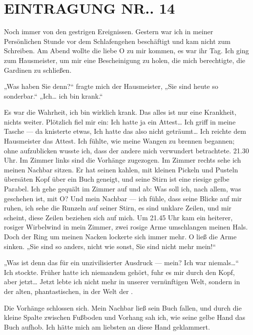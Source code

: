 \section{EINTRAGUNG NR.. 14}

Noch immer von den gestrigen Ereignissen. Gestern war ich in meiner
Persönlichen Stunde vor dem Schlafengehen beschäftigt und kam nicht
zum Schreiben. Am Abend wollte die liebe O zu mir kommen, es war
ihr Tag. Ich ging zum Hausmeister, um mir eine Bescheinigung zu
holen, die mich berechtigte, die Gardinen zu schließen.

„Was haben Sie denn?“ fragte mich der Hausmeister, „Sie sind heute
so sonderbar.“ „Ich\ldots{} ich bin krank.“

Es war die Wahrheit, ich bin wirklich krank. Das alles ist nur eine
Krankheit, nichts weiter. Plötzlich fiel mir ein: Ich hatte ja ein
Attest\ldots{} Ich griff in meine Tasche — da knisterte etwas, Ich hatte
das also nicht geträumt\ldots{} Ich reichte dem Hausmeister das Attest.
Ich fühlte, wie meine Wangen zu brennen begannen; ohne aufzublicken
wusste ich, dass der andere mich verwundert betrachtete. 21.30 Uhr.
Im Zimmer links sind die Vorhänge zugezogen. Im Zimmer rechts sehe
ich meinen Nachbar sitzen. Er hat seinen kahlen, mit kleinen
Pickeln und Pusteln übersäten Kopf über ein Buch geneigt, und seine
Stirn ist eine riesige gelbe Parabel. Ich gehe gequält im Zimmer
auf und ab: Was soll ich, nach allem, was geschehen ist, mit O? Und
mein Nachbar — ich fühle, dass seine Blicke auf mir ruhen, ich sehe
die Runzeln auf seiner Stirn, es sind unklare Zeilen, und mir
scheint, diese Zeilen beziehen sich auf mich. Um 21.45 Uhr kam ein
heiterer, rosiger Wirbelwind in
mein Zimmer, zwei rosige Arme umschlangen meinen Hals. Doch der
Ring um meinen Nacken lockerte sich immer mehr. O ließ die Arme
sinken. „Sie sind so anders, nicht wie sonst, Sie sind nicht mehr
mein!“

„Was ist denn das für ein unzivilisierter Ausdruck — mein? Ich war
niemals\ldots{}“ Ich stockte. Früher hatte ich niemandem gehört, fuhr es
mir durch den Kopf, aber jetzt\ldots{} Jetzt lebte ich nicht mehr in
unserer vernünftigen Welt, sondern in der alten, phantastischen, in
der Welt der \wurzel{}.

Die Vorhänge schlossen sich. Mein Nachbar ließ sein Buch fallen,
und durch die kleine Spalte zwischen Fußboden und Vorhang sah ich,
wie seine gelbe Hand das Buch aufhob. Ich hätte mich am liebsten an
diese Hand geklammert.

